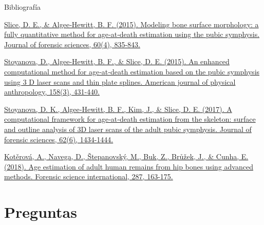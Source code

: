 \documentclass{beamer}
\begin{document}
\begin{frame}[allowframebreaks]{Bibliografía}
\begin{thebibliography}{9}
	\href{https://onlinelibrary.wiley.com/doi/full/10.1111/1556-4029.12778}{\scriptsize Slice, D. E., \& Algee‐Hewitt, B. F. (2015). Modeling bone surface morphology: a fully quantitative method for age‐at‐death estimation using the pubic symphysis. Journal of forensic sciences, 60(4), 835-843.}


	\href{https://onlinelibrary.wiley.com/doi/full/10.1002/ajpa.22797}{\scriptsize Stoyanova, D., Algee‐Hewitt, B. F., \& Slice, D. E. (2015). An enhanced computational method for age‐at‐death estimation based on the pubic symphysis using 3 D laser scans and thin plate splines. American journal of physical anthropology, 158(3), 431-440.}



	\href{https://onlinelibrary.wiley.com/doi/full/10.1111/1556-4029.13439}{\scriptsize Stoyanova, D. K., Algee‐Hewitt, B. F., Kim, J., \& Slice, D. E. (2017). A computational framework for age‐at‐death estimation from the skeleton: surface and outline analysis of 3D laser scans of the adult pubic symphysis. Journal of forensic sciences, 62(6), 1434-1444.}


	\href{https://www.sciencedirect.com/science/article/pii/S0379073818301440}{\scriptsize Kotěrová, A., Navega, D., Štepanovský, M., Buk, Z., Brůžek, J., \& Cunha, E. (2018). Age estimation of adult human remains from hip bones using advanced methods. Forensic science international, 287, 163-175.}


\end{thebibliography}


\end{frame}


\section{Preguntas}
\end{document}
